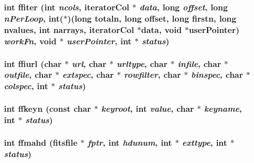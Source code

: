 \subsubsection{\setlength{\rightskip}{0pt plus 5cm}int ffiter (int {\em ncols}, \bf{iterator\-Col} $\ast$ {\em data}, long {\em offset}, long {\em n\-Per\-Loop}, int($\ast$)(long totaln, long offset, long firstn, long nvalues, int narrays, \bf{iterator\-Col} $\ast$data, void $\ast$user\-Pointer) {\em work\-Fn}, void $\ast$ {\em user\-Pointer}, int $\ast$ {\em status})}\label{test_2roimasker_2fitsio_8h_5629227f131024fb0f7cba79d91b9929}


\subsubsection{\setlength{\rightskip}{0pt plus 5cm}int ffiurl (char $\ast$ {\em url}, char $\ast$ {\em urltype}, char $\ast$ {\em infile}, char $\ast$ {\em outfile}, char $\ast$ {\em extspec}, char $\ast$ {\em rowfilter}, char $\ast$ {\em binspec}, char $\ast$ {\em colspec}, int $\ast$ {\em status})}\label{test_2roimasker_2fitsio_8h_841d8003c651737bdaaf3df7507a3691}


\subsubsection{\setlength{\rightskip}{0pt plus 5cm}int ffkeyn (const char $\ast$ {\em keyroot}, int {\em value}, char $\ast$ {\em keyname}, int $\ast$ {\em status})}\label{test_2roimasker_2fitsio_8h_8439e81e5e5ec5d57530c44db55ff774}


\subsubsection{\setlength{\rightskip}{0pt plus 5cm}int ffmahd (\bf{fitsfile} $\ast$ {\em fptr}, int {\em hdunum}, int $\ast$ {\em exttype}, int $\ast$ {\em status})}\label{test_2roimasker_2fitsio_8h_bf55072a6e71f57598a83d1b89d9ac4d}


